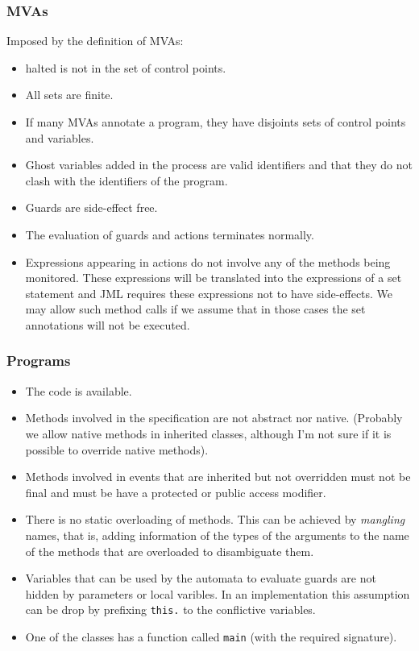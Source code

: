 \documentclass[a4paper,10pt]{article}
\begin{document}
\subsubsection*{MVAs} 
Imposed by the definition of MVAs:
\begin{itemize}
  \item \<halted\> is not in the set of control points.
  \item All sets are finite.
  \item If many MVAs annotate a program, they have disjoints sets of control points and variables.
  \item Ghost variables added in the process are valid identifiers and that they do not clash with the
identifiers of the program.
  \item Guards are side-effect free.
  \item The evaluation of guards and actions terminates normally.
  \item Expressions appearing in actions do not involve any of the methods being monitored. These expressions
will be translated into the expressions of a set statement and JML requires these expressions not to have
side-effects. We may allow such method calls if we assume that in those cases the set annotations will not be
executed.
\end{itemize}

\subsubsection*{Programs}
\begin{itemize}
  \item The code is available.
  \item Methods involved in the specification are not abstract nor native. (Probably we allow native methods
in inherited classes, although I'm not sure if it is possible to override native methods).
  \item Methods involved in events that are inherited but not overridden must not be final and must be have a
protected or public access modifier.
  \item There is no static overloading of methods. This can be achieved by \emph{mangling} names, that is,
adding information of the types of the arguments to the name of the methods that are overloaded to
disambiguate them.
  \item Variables that can be used by the automata to evaluate guards are not hidden by parameters or local
varibles. In an implementation this assumption can be drop by prefixing \texttt{this.} to the conflictive
variables.
  \item One of the classes has a function called \texttt{main} (with the required signature).
\end{itemize}
\end{document}
